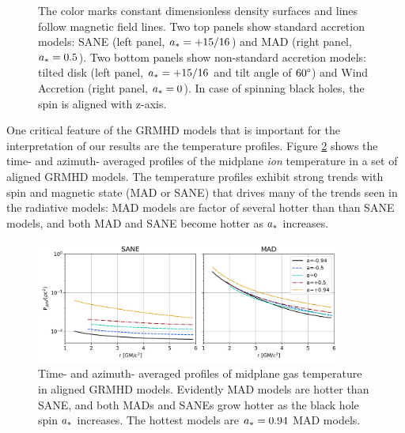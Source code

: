 \begin{figure}
{    The color marks constant dimensionless density surfaces and lines follow magnetic field lines.
    Two top panels show standard accretion models: SANE (left panel, $a_*=+15/16$) and MAD (right panel, $a_*=0.5$).
    Two bottom panels show non-standard accretion models: tilted disk (left panel, $a_*=+15/16$ and tilt angle of $60\degree$) and Wind Accretion (right panel, $a_*=0$).
    In case of spinning black holes, the spin is aligned with z-axis.
  }
  \label{fig:GRMHD}
\end{figure}

One critical feature of the GRMHD models that is important for the interpretation of our results are the temperature profiles.  Figure \ref{fig:grmhd_temp} shows the time- and azimuth- averaged profiles of the midplane {\em ion} temperature in a set of aligned GRMHD models.  The temperature profiles exhibit strong trends with spin and magnetic state (MAD or SANE) that drives many of the trends seen in the radiative models: MAD models are factor of several hotter than than SANE models, and both MAD and SANE become hotter as $a_*$ increases.  

\begin{figure}
  \centering
  \includegraphics[width=0.9\textwidth]{figures/grmhd_temp.png}
  \caption{Time- and azimuth- averaged profiles of midplane gas temperature in aligned GRMHD models.  Evidently MAD models are hotter than SANE, and both MADs and SANEs grow hotter as the black hole spin $a_*$ increases.  The hottest models are $a_* = 0.94$ MAD models.}
  \label{fig:grmhd_temp}
\end{figure}

